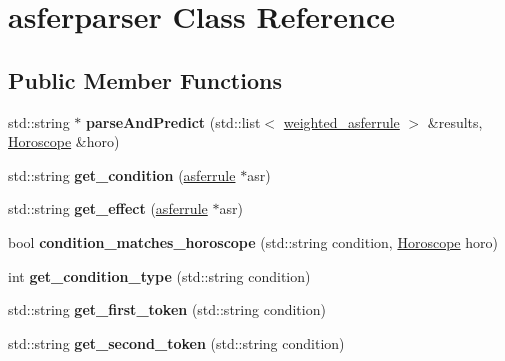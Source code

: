 \hypertarget{classasferparser}{\section{asferparser Class Reference}
\label{classasferparser}
}
\subsection*{Public Member Functions}
\begin{DoxyCompactItemize}
\item 
\hypertarget{classasferparser_a9379ff7cec733f85734c7b1ecdf58967}{std\-::string $\ast$ {\bfseries parse\-And\-Predict} (std\-::list$<$ \hyperlink{structweighted__asferrule}{weighted\-\_\-asferrule} $>$ \&results, \hyperlink{structHoroscope}{Horoscope} \&horo)}\label{classasferparser_a9379ff7cec733f85734c7b1ecdf58967}

\item 
\hypertarget{classasferparser_a30e244441179b4d2b6b1d1ff1b2caaf7}{std\-::string {\bfseries get\-\_\-condition} (\hyperlink{classasferrule}{asferrule} $\ast$asr)}\label{classasferparser_a30e244441179b4d2b6b1d1ff1b2caaf7}

\item 
\hypertarget{classasferparser_ab2512b37b76ec79c7da9eff71f587ba1}{std\-::string {\bfseries get\-\_\-effect} (\hyperlink{classasferrule}{asferrule} $\ast$asr)}\label{classasferparser_ab2512b37b76ec79c7da9eff71f587ba1}

\item 
\hypertarget{classasferparser_a47249e70fe0b303773314fc8e4d611f6}{bool {\bfseries condition\-\_\-matches\-\_\-horoscope} (std\-::string condition, \hyperlink{structHoroscope}{Horoscope} horo)}\label{classasferparser_a47249e70fe0b303773314fc8e4d611f6}

\item 
\hypertarget{classasferparser_a17bc89cd6c35164e329a7af7d224b70b}{int {\bfseries get\-\_\-condition\-\_\-type} (std\-::string condition)}\label{classasferparser_a17bc89cd6c35164e329a7af7d224b70b}

\item 
\hypertarget{classasferparser_a957b43e943986be82dc45b8395cbd014}{std\-::string {\bfseries get\-\_\-first\-\_\-token} (std\-::string condition)}\label{classasferparser_a957b43e943986be82dc45b8395cbd014}

\item 
\hypertarget{classasferparser_ab2dc8b424ac23cb550e65a3717e1eff0}{std\-::string {\bfseries get\-\_\-second\-\_\-token} (std\-::string condition)}\label{classasferparser_ab2dc8b424ac23cb550e65a3717e1eff0}


\end{DoxyCompactItemize}
